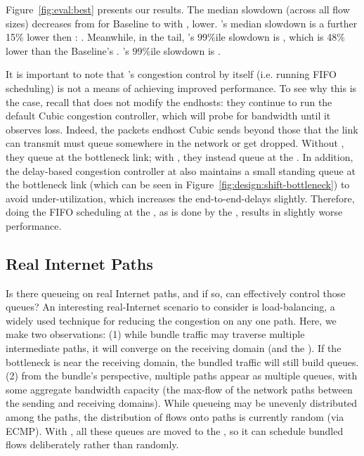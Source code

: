 Figure~\ref{fig:eval:best} presents our results. 
The median slowdown (across all flow sizes) decreases from \overviewBenefitsBaselineMedian 
for Baseline to \overviewBenefitsBundlerMedian 
with \name, \overviewBenefitsBundlerMedianImprovement
lower. 
\optimal's median slowdown is a further 15\% lower then \name: \overviewBenefitsOptimalMedian.
Meanwhile, in the tail, \name's $99\%$ile slowdown is \overviewBenefitsBundlerTail, which is 48\% lower than the Baseline's \overviewBenefitsBaselineTail. \optimal's $99\%$ile slowdown is \overviewBenefitsOptimalTail.

 It is important to note that \name's congestion control by itself (i.e. running FIFO scheduling) is not a means of achieving improved performance. 
To see why this is the case, recall that \name does not modify the endhosts: they continue to run the default Cubic congestion controller, which will probe for bandwidth until it observes loss.
Indeed, the packets endhost Cubic sends beyond those that the link can transmit must queue somewhere in the network or get dropped. 
Without \name, they queue at the bottleneck link;
with \name, they instead queue at the \inbox. 
In addition, the delay-based congestion controller at \inbox also maintains a small standing queue at the bottleneck link (which can be seen in Figure~\ref{fig:design:shift-bottleneck}) to avoid under-utilization, which increases the end-to-end-delays slightly. 
Therefore, doing the FIFO scheduling at the \name, as is done by the \baseline, results in slightly worse performance.

%

\subsection{Real Internet Paths}\label{s:eval:realworld}

Is there queueing on real Internet paths, and if so, can \name effectively control those queues?
An interesting real-Internet scenario to consider is load-balancing, a widely used technique for reducing the congestion on any one path.
Here, we make two observations: 
(1) while bundle traffic may traverse multiple intermediate paths, it will converge on the receiving domain (and the \outbox). If the bottleneck is near the receiving domain, the bundled traffic will still build queues.
(2) from the bundle's perspective, multiple paths appear as multiple queues, with some aggregate bandwidth capacity (\ie the max-flow of the network paths between the sending and receiving domains). While queueing may be unevenly distributed among the paths, the distribution of flows onto paths is currently random (\eg via ECMP). With \name, all these queues are moved to the \inbox, so it can schedule bundled flows deliberately rather than randomly.

